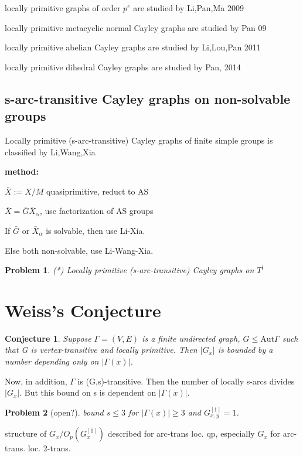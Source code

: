 \documentclass[a4,11pt]{article}
\newtheorem{conjecture}{Conjecture}[section]
\newtheorem{problem}{Problem}[section]
\def\Aut{\mathrm{Aut}}
\begin{document}
locally primitive graphs of order $p^e$ are studied by Li,Pan,Ma 2009

locally primitive metacyclic normal Cayley graphs are studied by Pan 09

locally primitive abelian Cayley graphs are studied by Li,Lou,Pan 2011

locally primitive dihedral Cayley graphs are studied by Pan, 2014


\subsection{s-arc-transitive Cayley graphs on non-solvable groups}
Locally primitive (s-arc-transitive) Cayley graphs of finite simple groups is classified by Li,Wang,Xia

\textbf{method:}

$\bar{X}:=X/M$ quasiprimitive, reduct to AS

$\bar{X}=\bar{G} \bar{X}_\alpha$, use factorization of AS groups

If $\bar{G}$ or $\bar{X}_\alpha$ is solvable, then use Li-Xia. 

Else both non-solvable, use Li-Wang-Xia. 

\begin{problem}(*)
	Locally primitive (s-arc-transitive) Cayley graphs on $T^l$
\end{problem}

\section{Weiss's Conjecture}

\begin{conjecture}
	Suppose $\Gamma = (V, E)$ is a finite undirected graph, $G\leq \Aut\Gamma$ such that G
is vertex-transitive and locally primitive. Then $|G_x|$ is bounded by a number depending only on $|\Gamma(x)|$.
\end{conjecture}

Now, in addition, $\Gamma$ is (G,s)-transitive. Then the number of locally s-arcs divides $|G_x|$. But this bound on s is dependent on $|\Gamma(x)|$.

\begin{problem}[open?]
	bound $s\leq 3$ for $|\Gamma(x)|\geq 3$ and $G_{x,y}^{[1]}=1$.
\end{problem}


structure of $G_x/O_p(G_x^{[1]})$ described for arc-trans loc. qp, especially $G_x$ for arc-trans. loc. 2-trans.
\end{document}
